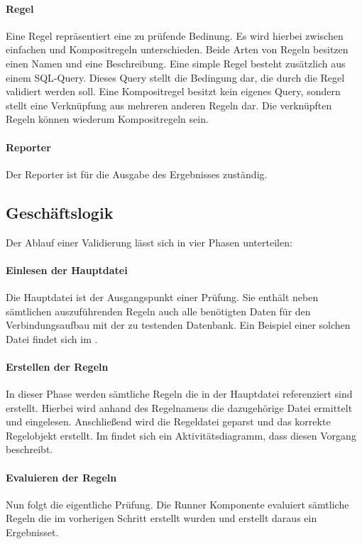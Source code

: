 \paragraph{Regel}
Eine Regel repräsentiert eine zu prüfende Bedinung. Es wird hierbei zwischen einfachen und Kompositregeln unterschieden. Beide Arten von Regeln besitzen einen Namen und eine Beschreibung. Eine simple Regel besteht zusätzlich aus einem \acs{SQL}-Query. Dieses Query stellt die Bedingung dar, die durch die Regel validiert werden soll. Eine Kompositregel besitzt kein eigenes Query, sondern stellt eine Verknüpfung aus mehreren anderen Regeln dar. Die verknüpften Regeln können wiederum Kompositregeln sein.

\paragraph{Reporter}
Der Reporter ist für die Ausgabe des Ergebnisses zuständig.


\subsection{Geschäftslogik}
\label{sec:Geschaeftslogik}

Der Ablauf einer Validierung lässt sich in vier Phasen unterteilen:

\paragraph{Einlesen der Hauptdatei}
Die Hauptdatei ist der Ausgangspunkt einer Prüfung. Sie enthält neben sämtlichen auszuführenden Regeln auch alle benötigten Daten für den Verbindungsaufbau mit der zu testenden Datenbank. Ein Beispiel einer solchen Datei findet sich im .

\paragraph{Erstellen der Regeln}
In dieser Phase werden sämtliche Regeln die in der Hauptdatei referenziert sind erstellt. Hierbei wird anhand des Regelnamens die dazugehörige Datei ermittelt und eingelesen. Anschließend wird die Regeldatei geparst und das korrekte Regelobjekt erstellt. Im  findet sich ein Aktivitätsdiagramm, dass diesen Vorgang beschreibt.

\paragraph{Evaluieren der Regeln}
Nun folgt die eigentliche Prüfung. Die Runner Komponente evaluiert sämtliche Regeln die im vorherigen Schritt erstellt wurden und erstellt daraus ein Ergebnisset.

